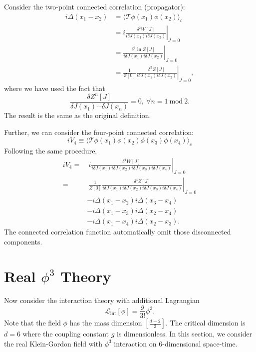 Consider the two-point connected correlation (propagator):
\begin{equation}
\begin{aligned}
	i\Delta(x_1-x_2)
	&= \langle \mathcal{T}\phi(x_1) \phi(x_2)\rangle_c \\
	&= i\left.\frac{\delta^2 W[J]}{i\delta J(x_1) i\delta J(x_2)}\right|_{J=0} \\
	&= \left.\frac{\delta^2 \ln Z[J]}{i\delta J(x_1) i\delta J(x_2)}\right|_{J=0}\\
	&= \frac{1}{Z[0]}\left.\frac{\delta^2 Z[J]}{i\delta J(x_1)i\delta J(x_2)}\right|_{J=0},
\end{aligned}
\end{equation}
where we have used the fact that
\begin{equation*}
	\frac{\delta Z^n[J]}{\delta J(x_1) \cdots \delta J(x_n)} = 0,\ \forall n = 1\ \mathrm{mod}\ 2.
\end{equation*}
The result is the same as the original definition.



Further, we can consider the four-point connected correlation:
\begin{equation*}
	iV_4 \equiv \langle \mathcal{T}\phi(x_1) \phi(x_2) \phi(x_3) \phi(x_4)\rangle_c
\end{equation*}
Following the same procedure,
\begin{equation}
\begin{aligned}
	iV_4 
	=&\ i\left.\frac{\delta^4 W[J]}{i\delta J(x_1)i\delta J(x_2)i\delta J(x_3)i\delta J(x_4)}\right|_{J=0} \\
	=&\ \frac{1}{Z[0]}\left.\frac{\delta^4 Z[J]}{i\delta J(x_1)i\delta J(x_2)i\delta J(x_3)i\delta J(x_4)}\right|_{J=0} \\
	& -i\Delta(x_1-x_2) i\Delta(x_3-x_4) \\
	& -i\Delta(x_1-x_3) i\Delta(x_2-x_4) \\
	& -i\Delta(x_1-x_4) i\Delta(x_2-x_3).
\end{aligned}
\end{equation}
The connected correlation function automatically omit those disconnected components.





\section{Real $\phi^3$ Theory}

Now consider the interaction theory with additional Lagrangian
\begin{equation}
	\mathcal L_{\mathrm{int}}[\phi] = \frac{g}{3!}\phi^3.
\end{equation}
Note that the field $\phi$ has the mass dimension $[\frac{d-2}{2}]$. 
The critical dimension is $d=6$ where the coupling constant $g$ is dimensionless. 
In this section, we consider the real Klein-Gordon field with $\phi^3$ interaction on 6-dimensional space-time.


